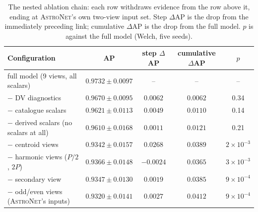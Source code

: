 \documentclass[preprint,12pt,authoryear]{elsarticle}
\newcommand{\astronet}{\textsc{AstroNet}}
\begin{document}
\begin{table}[t]
\centering
\caption{The nested ablation chain: each row withdraws evidence from the row
above it, ending at \astronet{}'s own two-view input set. Step $\Delta$AP is
the drop from the immediately preceding link; cumulative $\Delta$AP is the drop
from the full model. $p$ is against the full model (Welch, five seeds).}
\label{tab:nested}
\begin{tabular}{lcccc}
\toprule
Configuration & AP & step $\Delta$AP & cumulative $\Delta$AP & $p$ \\
\midrule
full model (9 views, all scalars)      & $0.9732 \pm 0.0097$ & --      & --      & --    \\
$-$ DV diagnostics                      & $0.9670 \pm 0.0095$ & $0.0062$ & $0.0062$ & 0.34 \\
$-$ catalogue scalars                   & $0.9621 \pm 0.0113$ & $0.0049$ & $0.0110$ & 0.14 \\
$-$ derived scalars (no scalars at all) & $0.9610 \pm 0.0168$ & $0.0011$ & $0.0121$ & 0.21 \\
$-$ centroid views                      & $0.9342 \pm 0.0157$ & $0.0268$ & $0.0389$ & $2\times10^{-3}$ \\
$-$ harmonic views ($P/2$, $2P$)        & $0.9366 \pm 0.0148$ & $-0.0024$ & $0.0365$ & $3\times10^{-3}$ \\
$-$ secondary view                      & $0.9347 \pm 0.0130$ & $0.0019$ & $0.0385$ & $9\times10^{-4}$ \\
$-$ odd/even views (\astronet{}'s inputs) & $0.9320 \pm 0.0141$ & $0.0027$ & $0.0412$ & $9\times10^{-4}$ \\
\bottomrule
\end{tabular}
\end{table}
\end{document}
